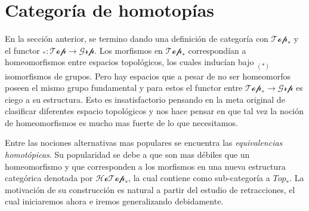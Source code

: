 \section{Categoría de homotopías}
En la sección anterior, se termino dando una definición de categoría con
\(\mathscr{Top}_*\) y el functor \(_{{*}} : \mathscr{Top} \to
\mathscr{Grp}\). Los morfismos en \(\mathscr{Top}_*\) correspondían a
homeomorfismos entre espacios topológicos, los cuales inducían bajo
\(_{(*)}\) isomorfismos de grupos. Pero hay espacios que a pesar de no
ser homeomorfos poseen el mismo grupo fundamental y para estos el
functor entre \(\mathscr{Top}_* \to \mathscr{Grp}\) es ciego a su
estructura. Esto es insatisfactorio pensando en la meta original de
clasificar diferentes espacio topológicos y nos hace pensar en que
tal vez la noción de homeomorfismos es mucho mas fuerte de lo que
necesitamos.

Entre las nociones alternativas mas populares se encuentra las
\emph{equivalencias homotópicas}. Su popularidad se debe a que son mas
débiles que un homeomorfismo y que corresponden a los morfismos en una
nueva estructura categórica denotada por \(\mathscr{HoTop}_*\), la cual
contiene como sub-categoría a \(Top_*\). La motivación de su
construcción es natural a partir del estudio de retracciones, el cual
iniciaremos ahora e iremos generalizando debidamente.

